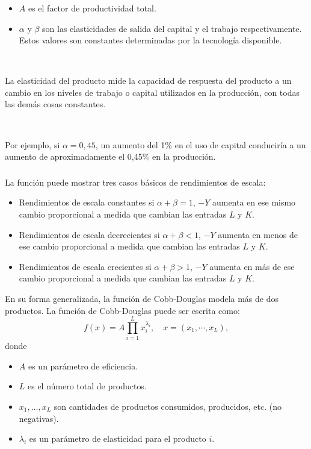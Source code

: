 \begin{frame}
\frametitle{\secname}
\begin{itemize}
	\item $A$ es el factor de productividad total.
	\item $\alpha$ y $\beta$ son las elasticidades de salida del capital y el trabajo respectivamente. Estos valores son constantes determinadas por la tecnología disponible.
\end{itemize}

\

La elasticidad del producto mide la capacidad de respuesta del producto a un cambio en los niveles de trabajo o capital utilizados en la producción, con todas las demás cosas constantes.

\

Por ejemplo, si $\alpha=0,45$, un aumento del 1\% en el uso de capital conduciría a un aumento de aproximadamente el 0,45\% en la producción.
\end{frame}

\begin{frame}[t]
\frametitle{\secname}

La función puede mostrar tres casos básicos de rendimientos de escala:
\begin{itemize}
	\item Rendimientos de escala constantes si $\alpha+\beta=1$, $-Y$ aumenta en ese mismo cambio proporcional a medida que cambian las entradas $L$ y $K$.
	\item Rendimientos de escala decrecientes si $\alpha+\beta<1$, $-Y$ aumenta en menos de ese cambio proporcional a medida que cambian las entradas $L$ y $K$.
	\item Rendimientos de escala crecientes si $\alpha+\beta>1$, $-Y$ aumenta en más de ese cambio proporcional a medida que cambian las entradas $L$ y $K$.
\end{itemize}

En su forma generalizada, la función de Cobb-Douglas modela más de dos productos. La función de Cobb-Douglas puede ser escrita como:
\begin{equation}
f\left(x\right)=A\prod_{i=1}^{L}x_{i}^{\lambda_{i}},\quad x=\left(x_{1},\cdots,x_{L} \right),
\end{equation}
donde
\begin{itemize}
	\item $A$ es un parámetro de eficiencia.
	\item $L$ es el número total de productos.
	\item $x_{1},\ldots,x_{L}$ son cantidades de productos consumidos, producidos, etc. (no negativas).
	\item $\lambda_{i}$ es un parámetro de elasticidad para el producto $i$.
\end{itemize}
\end{frame}
